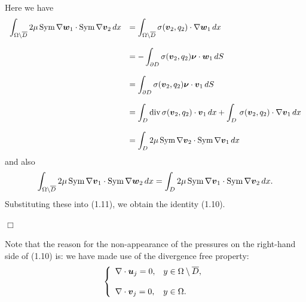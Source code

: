 Here we have
$$\begin{array}{ll}
\displaystyle
\int_{\Omega\setminus\overline{D}}2\mu\,
\text{Sym}\,\nabla\mbox{\boldmath $w$}_1\cdot
\text{Sym}\,\nabla\mbox{\boldmath $v$}_2\,dx
&
\displaystyle
=\int_{\Omega\setminus\overline{D}}\sigma(\mbox{\boldmath $v$}_2, q_2)\cdot\nabla\mbox{\boldmath $w$}_1\,dx\\
\\
\displaystyle
&
\displaystyle
=-\int_{\partial D}\sigma(\mbox{\boldmath $v$}_2, q_2)\mbox{\boldmath $\nu$}\cdot\mbox{\boldmath $w$}_1\,dS
\\
\\
\displaystyle
&
\displaystyle
=\int_{\partial D}\sigma(\mbox{\boldmath $v$}_2, q_2)\mbox{\boldmath $\nu$}\cdot\mbox{\boldmath $v$}_1\,dS
\\
\\
\displaystyle
&
\displaystyle
=\int_D \text{div}\,\sigma(\mbox{\boldmath $v$}_2,q_2)\cdot\mbox{\boldmath $v$}_1\,dx
+\int_{D}\,\sigma(\mbox{\boldmath $v$}_2,q_2)\cdot\nabla\mbox{\boldmath $v$}_1\,dx
\\
\\
\displaystyle
&
\displaystyle
=\int_{D}2\mu\,\text{Sym}\,\nabla\mbox{\boldmath $v$}_2\cdot\text{Sym}\,\nabla\mbox{\boldmath $v$}_1\,dx
\end{array}
$$
and also
$$
\displaystyle
\int_{\Omega\setminus\overline{D}}2\mu\,
\text{Sym}\,\nabla\mbox{\boldmath $v$}_1\cdot
\text{Sym}\,\nabla\mbox{\boldmath $w$}_2\,dx
=\int_{D}2\mu\,\text{Sym}\,\nabla\mbox{\boldmath $v$}_1\cdot\text{Sym}\,\nabla\mbox{\boldmath $v$}_2\,dx.
$$
Substituting these into (1.11), we obtain the identity (1.10).

\noindent
$\Box$












\noindent
Note that the reason for the non-appearance of
the pressures  on the right-hand side of (1.10)  is: we have made use of the divergence free property:
$$\left\{
\begin{array}{ll}
\displaystyle
\nabla\cdot\mbox{\boldmath $u$}_j=0, & y\in\Omega\setminus\overline{D},\\
\\
\displaystyle
\nabla\cdot\mbox{\boldmath $v$}_j=0, & y\in\Omega.
\end{array}
\right.
$$




